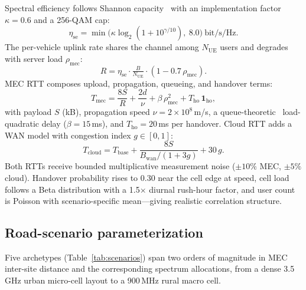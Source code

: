\documentclass[10pt,conference]{IEEEtran}
\begin{document}
Spectral efficiency follows Shannon capacity~\cite{shannon1948} with an
implementation factor $\kappa = 0.6$ and a 256-QAM cap:
\begin{equation}
\eta_{\mathrm{se}} = \min\bigl(\kappa \log_2 (1 + 10^{\gamma/10}),\ 8.0\bigr)
\ \text{bit/s/Hz}.
\label{eq:se}
\end{equation}
The per-vehicle uplink rate shares the channel among $N_{\mathrm{UE}}$
users and degrades with server load $\rho_{\mathrm{mec}}$:
\begin{equation}
R = \eta_{\mathrm{se}} \cdot \tfrac{B}{N_{\mathrm{UE}}}
    \cdot (1 - 0.7\,\rho_{\mathrm{mec}}).
\label{eq:rate}
\end{equation}
MEC RTT composes upload, propagation, queueing, and handover terms:
\begin{equation}
T_{\mathrm{mec}} = \frac{8S}{R} + \frac{2d}{\nu}
 + \beta\,\rho_{\mathrm{mec}}^{2} + T_{\mathrm{ho}}\,\mathbf{1}_{\mathrm{ho}},
\label{eq:tmec}
\end{equation}
with payload $S$ (kB), propagation speed $\nu = 2\times10^{8}$\,m/s, a
queue-theoretic~\cite{kleinrock} load-quadratic delay ($\beta = 15$\,ms),
and $T_{\mathrm{ho}} = 20$\,ms per handover.  Cloud RTT adds a WAN model
with congestion index $g \in [0,1]$:
\begin{equation}
T_{\mathrm{cloud}} = T_{\mathrm{base}}
 + \frac{8S}{B_{\mathrm{wan}} / (1 + 3g)} + 30\,g .
\label{eq:tcloud}
\end{equation}
Both RTTs receive bounded multiplicative measurement noise
($\pm10\%$ MEC, $\pm5\%$ cloud).  Handover probability rises to 0.30
near the cell edge at speed, cell load follows a Beta distribution with
a 1.5$\times$ diurnal rush-hour factor, and user count is Poisson with
scenario-specific mean---giving realistic correlation structure.

\subsection{Road-scenario parameterization}

Five archetypes (Table~\ref{tab:scenarios}) span two orders of magnitude in
MEC inter-site distance and the corresponding spectrum allocations, from a
dense 3.5\,GHz urban micro-cell layout to a 900\,MHz rural macro cell.
\end{document}
